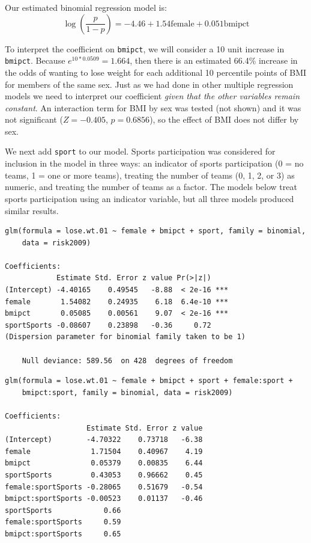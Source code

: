 \documentclass[
]{krantz}
\begin{document}
Our estimated binomial regression model is:
\[\log\left(\frac{{p}}{1-{p}}\right)= -4.46+1.54\textrm{female}+0.051\textrm{bmipct}\]

To interpret the coefficient on \texttt{bmipct}, we will consider a 10 unit increase in \texttt{bmipct}. Because \(e^{10*0.0509}=1.664\), then there is an estimated 66.4\% increase in the odds of wanting to lose weight for each additional 10 percentile points of BMI for members of the same sex. Just as we had done in other multiple regression models we need to interpret our coefficient \emph{given that the other variables remain constant}. An interaction term for BMI by sex was tested (not shown) and it was not significant (\(Z=-0.405\), \(p=0.6856\)), so the effect of BMI does not differ by sex.

We next add \texttt{sport} to our model. Sports participation was considered for inclusion in the model in three ways: an indicator of sports participation (0 = no teams, 1 = one or more teams), treating the number of teams (0, 1, 2, or 3) as numeric, and treating the number of teams as a factor. The models below treat sports participation using an indicator variable, but all three models produced similar results.

\begin{verbatim}
glm(formula = lose.wt.01 ~ female + bmipct + sport, family = binomial, 
    data = risk2009)

Coefficients:
            Estimate Std. Error z value Pr(>|z|)    
(Intercept) -4.40165    0.49545   -8.88  < 2e-16 ***
female       1.54082    0.24935    6.18  6.4e-10 ***
bmipct       0.05085    0.00561    9.07  < 2e-16 ***
sportSports -0.08607    0.23898   -0.36     0.72    
(Dispersion parameter for binomial family taken to be 1)

    Null deviance: 589.56  on 428  degrees of freedom
\end{verbatim}

\begin{verbatim}
glm(formula = lose.wt.01 ~ female + bmipct + sport + female:sport + 
    bmipct:sport, family = binomial, data = risk2009)

Coefficients:
                   Estimate Std. Error z value
(Intercept)        -4.70322    0.73718   -6.38
female              1.71504    0.40967    4.19
bmipct              0.05379    0.00835    6.44
sportSports         0.43053    0.96662    0.45
female:sportSports -0.28065    0.51679   -0.54
bmipct:sportSports -0.00523    0.01137   -0.46
sportSports            0.66    
female:sportSports     0.59    
bmipct:sportSports     0.65    
\end{verbatim}
\end{document}
